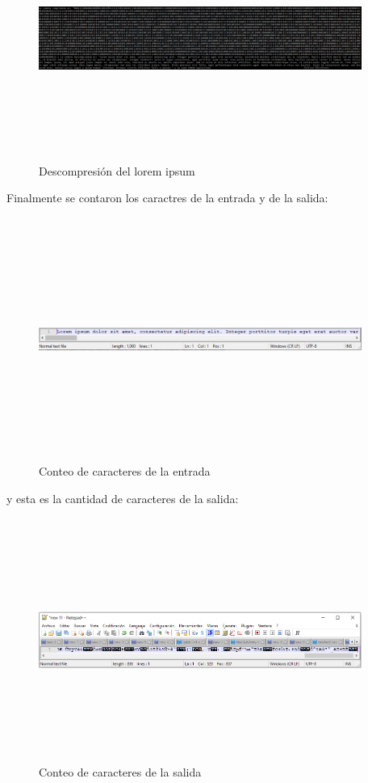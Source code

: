 \documentclass[spanish]{article}
\begin{document}
	\begin{figure}[H]
		\centering
		\includegraphics[width=400px,height=300px]{captura6}
		\caption{Descompresión del lorem ipsum}
	\end{figure}
	Finalmente se contaron los caractres de la entrada y de la salida:
	\begin{figure}[H]
		\centering
		\includegraphics[width=400px,height=300px]{captura7}
		\caption{Conteo de caracteres de la entrada}
	\end{figure}
	y esta es la cantidad de caracteres de la salida:
	\begin{figure}[H]
		\centering
		\includegraphics[width=400px,height=300px]{captura8}
		\caption{Conteo de caracteres de la salida}
	\end{figure}
	
\end{document}
